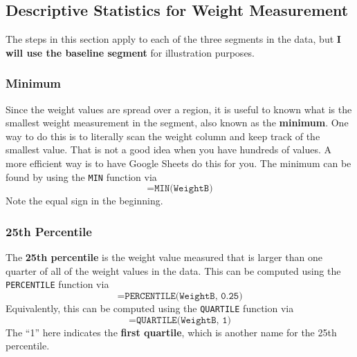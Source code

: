 \subsection{Descriptive Statistics for Weight Measurement}
The steps in this section apply to each of the three segments in the data, but \textbf{I will use the baseline segment} for illustration purposes.
\subsubsection{Minimum}
Since the weight values are spread over a region, it is useful to known what is the smallest weight measurement in the segment, also known as the \textbf{minimum}. One way to do this is to literally scan the weight column and keep track of the smallest value. That is not a good idea when you have hundreds of values. A more efficient way is to have Google Sheets do this for you. The minimum can be found by using the \texttt{MIN} function via
\begin{equation}
    \texttt{=MIN(WeightB)}
\end{equation}
Note the equal sign in the beginning.
\subsubsection{25th Percentile}
The \textbf{25th percentile} is the weight value measured that is larger than one quarter of all of the weight values in the data. This can be computed using the \texttt{PERCENTILE} function via
\begin{equation}
    \texttt{=PERCENTILE(WeightB, 0.25)}
\end{equation}
Equivalently, this can be computed using the \texttt{QUARTILE} function via
\begin{equation}
    \texttt{=QUARTILE(WeightB, 1)}
\end{equation}
The ``1'' here indicates the \textbf{first quartile}, which is another name for the 25th percentile.
